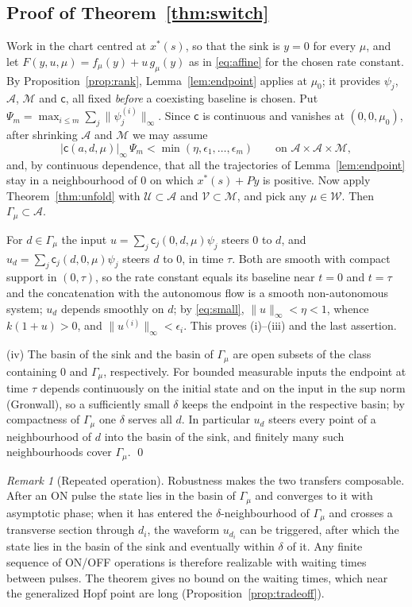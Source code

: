 \documentclass[11pt,a4paper]{article}
\theoremstyle{plain}
\theoremstyle{definition}
\theoremstyle{remark}
\newtheorem{remark}[theorem]{Remark}
\newcommand{\cW}{\mathcal W}
\newcommand{\norm}[1]{\lVert#1\rVert}
\newcommand{\abs}[1]{\lvert#1\rvert}
\begin{document}
\subsection{Proof of Theorem~\ref{thm:switch}}
Work in the chart centred at $x^*(s)$, so that the sink is $y=0$ for every $\mu$, and let $F(y,u,\mu)=f_\mu(y)+u\,g_\mu(y)$ as in \eqref{eq:affine} for the chosen rate constant. By Proposition~\ref{prop:rank}, Lemma~\ref{lem:endpoint} applies at $\mu_0$; it provides $\psi_j$, $\mathcal A$, $\mathcal M$ and $\mathsf c$, all fixed \emph{before} a coexisting baseline is chosen. Put $\Psi_m=\max_{i\le m}\sum_j\norm{\psi_j^{(i)}}_\infty$. Since $\mathsf c$ is continuous and vanishes at $(0,0,\mu_0)$, after shrinking $\mathcal A$ and $\mathcal M$ we may assume
\begin{equation}\label{eq:small}
\abs{\mathsf c(a,d,\mu)}_\infty\,\Psi_m<\min(\eta,\epsilon_1,\dots,\epsilon_m)\qquad\text{on }\mathcal A\times\mathcal A\times\mathcal M,
\end{equation}
and, by continuous dependence, that all the trajectories of Lemma~\ref{lem:endpoint} stay in a neighbourhood of $0$ on which $x^*(s)+Py$ is positive. Now apply Theorem~\ref{thm:unfold} with $\mathcal U\subset\mathcal A$ and $\mathcal V\subset\mathcal M$, and pick any $\mu\in\cW$. Then $\Gamma_\mu\subset\mathcal A$.

For $d\in\Gamma_\mu$ the input $u=\sum_j\mathsf c_j(0,d,\mu)\psi_j$ steers $0$ to $d$, and $u_d=\sum_j\mathsf c_j(d,0,\mu)\psi_j$ steers $d$ to $0$, in time $\tau$. Both are smooth with compact support in $(0,\tau)$, so the rate constant equals its baseline near $t=0$ and $t=\tau$ and the concatenation with the autonomous flow is a smooth non-autonomous system; $u_d$ depends smoothly on $d$; by \eqref{eq:small}, $\norm u_\infty<\eta<1$, whence $k(1+u)>0$, and $\norm{u^{(i)}}_\infty<\epsilon_i$. This proves (i)--(iii) and the last assertion.

(iv) The basin of the sink and the basin of $\Gamma_\mu$ are open subsets of the class containing $0$ and $\Gamma_\mu$, respectively. For bounded measurable inputs the endpoint at time $\tau$ depends continuously on the initial state and on the input in the sup norm (Gronwall), so a sufficiently small $\delta$ keeps the endpoint in the respective basin; by compactness of $\Gamma_\mu$ one $\delta$ serves all $d$. In particular $u_d$ steers every point of a neighbourhood of $d$ into the basin of the sink, and finitely many such neighbourhoods cover $\Gamma_\mu$. \qed

\begin{remark}[Repeated operation]
Robustness makes the two transfers composable. After an ON pulse the state lies in the basin of $\Gamma_\mu$ and converges to it with asymptotic phase; when it has entered the $\delta$-neighbourhood of $\Gamma_\mu$ and crosses a transverse section through $d_i$, the waveform $u_{d_i}$ can be triggered, after which the state lies in the basin of the sink and eventually within $\delta$ of it. Any finite sequence of ON/OFF operations is therefore realizable with waiting times between pulses. The theorem gives no bound on the waiting times, which near the generalized Hopf point are long (Proposition~\ref{prop:tradeoff}).
\end{remark}
\end{document}
